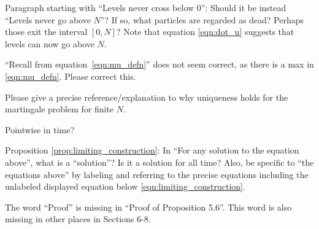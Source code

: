 \begin{point}{\revref}
Paragraph starting with ``Levels never cross below 0'': Should it be instead ``Levels never
go above $N$''? If so, what particles are regarded as dead? Perhaps those exit the interval
$[0, N]$? Note that equation \eqref{eqn:dot_u} suggests that levels can now go above $N$.
\end{point}


\begin{point}{\revref}
``Recall from equation~\eqref{eqn:mu_defn}''
does not seem correct, as there is a max in \eqref{eqn:mu_defn}. Please
correct this.
\end{point}


\begin{point}{\revref}
Please give a precise reference/explanation to why uniqueness holds for the martingale problem for finite $N$.
\end{point}


\begin{point}{\revref}
    Pointwise in time?
\end{point}


\begin{point}{\revref}
Proposition \ref{prop:limiting_construction}: In ``For any solution to the equation above'', what is a ``solution''? Is it
a solution for all time? Also, be specific to ``the equations above'' by labeling and referring
to the precise equations including the unlabeled displayed equation below \eqref{eqn:limiting_construction}.
\end{point}


\begin{point}{}
The word ``Proof'' is missing in ``Proof of Proposition 5.6''. This word is also
missing in other places in Sections 6-8.
\end{point}


